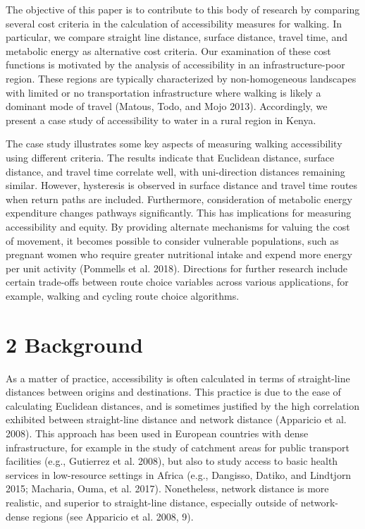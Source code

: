 \documentclass[]{elsarticle} %
\begin{document}
The objective of this paper is to contribute to this body of research by
comparing several cost criteria in the calculation of accessibility
measures for walking. In particular, we compare straight line distance,
surface distance, travel time, and metabolic energy as alternative cost
criteria. Our examination of these cost functions is motivated by the
analysis of accessibility in an infrastructure-poor region. These
regions are typically characterized by non-homogeneous landscapes with
limited or no transportation infrastructure where walking is likely a
dominant mode of travel (Matous, Todo, and Mojo 2013). Accordingly, we
present a case study of accessibility to water in a rural region in
Kenya.

The case study illustrates some key aspects of measuring walking
accessibility using different criteria. The results indicate that
Euclidean distance, surface distance, and travel time correlate well,
with uni-direction distances remaining similar. However, hysteresis is
observed in surface distance and travel time routes when return paths
are included. Furthermore, consideration of metabolic energy expenditure
changes pathways significantly. This has implications for measuring
accessibility and equity. By providing alternate mechanisms for valuing
the cost of movement, it becomes possible to consider vulnerable
populations, such as pregnant women who require greater nutritional
intake and expend more energy per unit activity (Pommells et al. 2018).
Directions for further research include certain trade-offs between route
choice variables across various applications, for example, walking and
cycling route choice algorithms.

\hypertarget{background}{%
\section{2 Background}\label{background}}

As a matter of practice, accessibility is often calculated in terms of
straight-line distances between origins and destinations. This practice
is due to the ease of calculating Euclidean distances, and is sometimes
justified by the high correlation exhibited between straight-line
distance and network distance (Apparicio et al. 2008). This approach has
been used in European countries with dense infrastructure, for example
in the study of catchment areas for public transport facilities (e.g.,
Gutierrez et al. 2008), but also to study access to basic health
services in low-resource settings in Africa (e.g., Dangisso, Datiko, and
Lindtjorn 2015; Macharia, Ouma, et al. 2017). Nonetheless, network
distance is more realistic, and superior to straight-line distance,
especially outside of network-dense regions (see Apparicio et al. 2008,
9).
\end{document}
